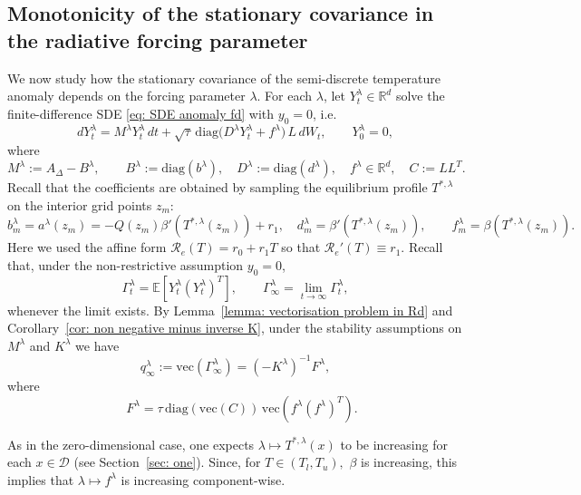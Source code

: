 \documentclass[10pt]{amsart}
\numberwithin{equation}{section}
\begin{document}
\subsection{Monotonicity of the stationary covariance in the radiative forcing parameter}
\label{subsec: monotone covariance}


We now study how the stationary covariance of the semi-discrete temperature anomaly depends on the forcing
parameter $\lambda$. For each $\lambda$, let $Y_t^\lambda\in\mathbb{R}^d$ solve the finite-difference SDE
\eqref{eq: SDE anomaly fd} with $y_0=0$, i.e.
\begin{equation*}
dY_t^\lambda = M^\lambda Y_t^\lambda\,dt
+ \sqrt{\tau}\, \mathrm{diag} \bigl(D^\lambda Y_t^\lambda + f^\lambda\bigr)\,L\,dW_t,
\qquad
Y_0^\lambda=0,
\end{equation*}
where
$$
M^\lambda := A_\Delta - B^\lambda,
\qquad
B^\lambda := \mathrm{diag}(b^\lambda),\quad D^\lambda := \mathrm{diag}(d^\lambda),\quad f^\lambda\in\mathbb{R}^d,
\quad C:=LL^T .
$$
Recall that the coefficients are obtained by sampling the equilibrium profile $T^{*,\lambda}$ on the interior
grid points $z_m$:
\begin{equation}
\label{eq:coeffs-sampled}
b_m^\lambda = a^\lambda(z_m)
= - Q(z_m) \beta' \left(T^{*,\lambda}(z_m)\right) + r_1,
\quad
d_m^\lambda = \beta' \left(T^{*,\lambda}(z_m)\right),
\qquad
f_m^\lambda = \beta \left(T^{*,\lambda}(z_m)\right).
\end{equation}
Here we used the affine form $\mathcal R_e(T)=r_0+r_1T$ so that $\mathcal R_e'(T)\equiv r_1$. Recall that, under the non-restrictive assumption $y_0 =0$,
$$
\Gamma_t ^\lambda = \mathbb{E}\left[Y_t^\lambda (Y_t^\lambda)^T\right],
\qquad
\Gamma _\infty^\lambda = \lim_{t\to\infty} \Gamma_t ^\lambda,
$$
whenever the limit exists. By Lemma~\ref{lemma: vectorisation problem in Rd} and
Corollary~\ref{cor: non negative  minus inverse K}, under the stability assumptions on $M^\lambda$ and $K^\lambda$
we have
\begin{equation*}
q_\infty^\lambda := \mathrm{vec}(\Gamma _\infty^\lambda) = (-K^\lambda)^{-1}F^\lambda,
\end{equation*}
where
\begin{equation}
\label{eq:KFlambda}
\quad
F^\lambda = \tau\,\mathrm{diag}(\mathrm{vec}(C)) \, \mathrm{vec}(f^\lambda (f^\lambda)^T).
\end{equation}


As in the zero-dimensional case, one expects $\lambda\mapsto T^{*,\lambda}(x)$ to be increasing for each $x\in \mathcal{D}$
(see Section~\ref{sec: one}). Since, for $T \in (T_l, T_u),$ $\beta$ is increasing, this implies that $\lambda\mapsto f^\lambda$ is
increasing component-wise.
\end{document}
